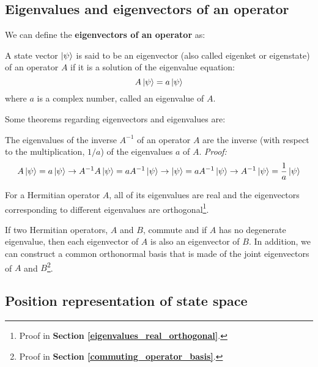 \subsection{Eigenvalues and eigenvectors of an operator}

We can define the \textbf{eigenvectors of an operator} as:

\begin{definition}
    A state vector $\ket{\psi}$ is said to be an eigenvector (also called eigenket or eigenstate) of an operator $A$ if it is a solution of the eigenvalue equation:
    \begin{equation}
        A\ket{\psi} = a\ket{\psi}
    \end{equation}
    where $a$ is a complex number, called an eigenvalue of $A$.
\end{definition}

Some theorems regarding eigenvectors and eigenvalues are:
\begin{theorem}
    The eigenvalues of the inverse $A^{-1}$ of an operator $A$ are the inverse (with respect to the multiplication, $1/a$) of the eigenvalues $a$ of $A$. \textit{Proof:}
    \begin{equation}
        A\ket{\psi} = a\ket{\psi}\to A^{-1}A\ket{\psi} = aA^{-1}\ket{\psi} \to \ket{\psi} = a A^{-1}\ket{\psi}\to A^{-1}\ket{\psi} = \frac1a \ket{\psi}
    \end{equation}
\end{theorem}
\begin{theorem}
    For a Hermitian operator $A$, all of its eigenvalues are real and the eigenvectors corresponding to different eigenvalues are orthogonal\footnote{Proof in \textbf{Section \ref{eigenvalues_real_orthogonal}}.}.
\end{theorem}
\begin{theorem} \label{commuting_operator_base_thm}
    If two Hermitian operators, $A$ and $B$, commute and if $A$ has no degenerate eigenvalue, then each eigenvector of $A$ is also an eigenvector of $B$. In addition, we can construct a common orthonormal basis that is made of the joint eigenvectors of $A$ and $B$\footnote{Proof in \textbf{Section \ref{commuting_operator_basis}}.}.
\end{theorem}


\subsection{Position representation of state space}

